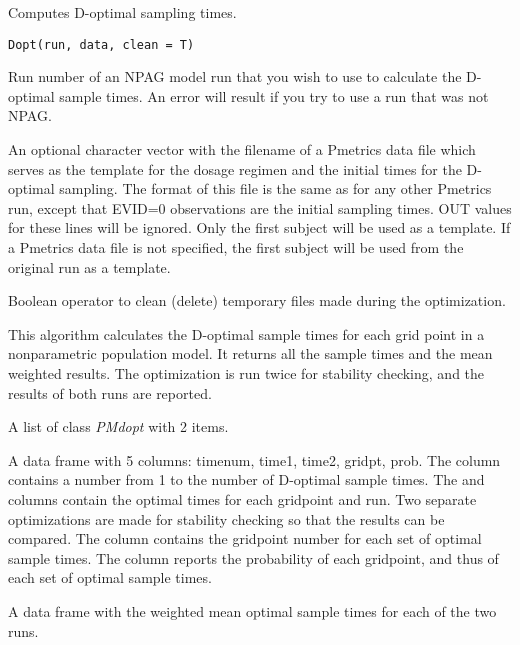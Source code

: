 \documentclass[a4paper]{book}
\begin{document}
%
\begin{Description}\relax
Computes D-optimal sampling times.
\end{Description}
%
\begin{Usage}
\begin{verbatim}
Dopt(run, data, clean = T)
\end{verbatim}
\end{Usage}
%
\begin{Arguments}
\begin{ldescription}
\item[\code{run}] Run number of an NPAG model run that you wish to use to calculate the D-optimal sample times. An error will result if you try to use a run that was not NPAG.

\item[\code{data}] An optional character vector with the filename of a Pmetrics data file which serves as the template for the dosage regimen and the initial times for the D-optimal sampling.  The format of this file is the same as for any other Pmetrics run, except that EVID=0 observations are the initial sampling times.  OUT values for these lines will be ignored.  Only the first subject will be used as a template.  If a Pmetrics data file is not specified, the first subject will be used from the original run as a template.

\item[\code{clean}] Boolean operator to clean (delete) temporary files made during the optimization.
\end{ldescription}
\end{Arguments}
%
\begin{Details}\relax
This algorithm calculates the D-optimal sample times for each grid point 
in a nonparametric population model.  It returns all the sample times and the mean weighted
results.  The optimization is run twice for stability checking, and the results of both runs
are reported.
\end{Details}
%
\begin{Value}
A list of class \emph{PMdopt} with 2 items.
\begin{ldescription}
\item[\code{allDopt }] A data frame with 5 columns: timenum, time1, time2, gridpt, prob.  The  column contains a number from 1 to the number of D-optimal sample times.  The  and  columns contain the optimal times for each gridpoint and run.  Two separate optimizations are made for stability checking so that the results can be compared.  The  column contains the gridpoint number for each set of optimal sample times.  The  column reports the probability of each gridpoint, and thus of each set of optimal sample times.
\item[\code{means }] A data frame with the weighted mean optimal sample times for each of the two runs.
\end{ldescription}
\end{Value}
\end{document}
